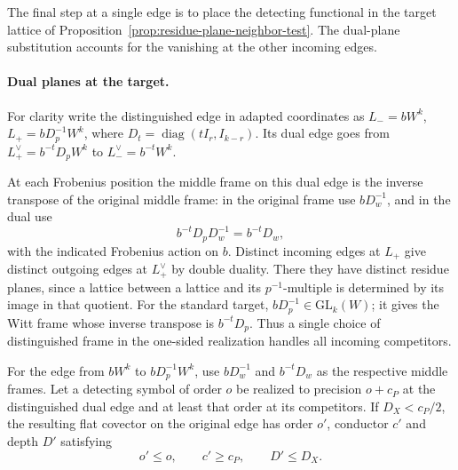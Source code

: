 The final step at a single edge is to place the detecting
functional in the target lattice of
Proposition~\ref{prop:residue-plane-neighbor-test}.
The dual-plane substitution accounts for the vanishing at
the other incoming edges.
\paragraph{Dual planes at the target.}
\label{par:plane-dual-edge}
\hypertarget{source-plane-edge-covector}{}
For clarity write the distinguished edge in adapted coordinates as
\(L_-=b W^k\), \(L_+=b D_p^{-1}W^k\), where
\(D_t=\operatorname{diag}(tI_r,I_{k-r})\). Its dual edge goes
from \(L_+^\vee=b^{-t}D_p W^k\) to
\(L_-^\vee=b^{-t}W^k\).

At each Frobenius position the middle
frame on this dual edge is the inverse transpose of the original
middle frame: in the original frame use \(bD_w^{-1}\), and in
the dual use
\[
 b^{-t}D_p D_w^{-1}=b^{-t}D_w,
\]
with the
indicated Frobenius action on \(b\). Distinct incoming edges at
\(L_+\) give distinct outgoing edges at \(L_+^\vee\) by double
duality. There they have distinct residue planes, since a lattice
between a lattice and its \(p^{-1}\)-multiple is determined by
its image in that quotient. For the standard target,
\(bD_p^{-1}\in\mathrm{GL}_k(W)\); it gives the Witt frame
whose inverse transpose is \(b^{-t}D_p\). Thus a single choice
of distinguished frame in the one-sided realization handles all
incoming competitors.

\begin{lemma}\label{lem:plane-dual-edge-test}
For the edge from \(bW^k\) to \(bD_p^{-1}W^k\), use
\(bD_w^{-1}\) and \(b^{-t}D_w\) as the respective middle frames.
Let a detecting
symbol of order \(o\) be realized to precision \(o+c_P\)
at the distinguished dual edge and at least that order
at its competitors. If \(D_X<c_P/2\), the resulting flat covector on the original edge has order \(o'\), conductor \(c'\) and depth \(D'\) satisfying
\[
 o'\le o,\qquad c'\ge c_P,\qquad D'\le D_X.
\]

\end{lemma}

